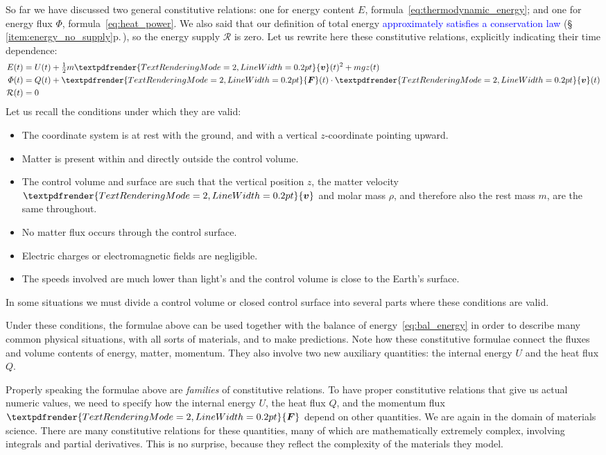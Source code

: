\documentclass[a4paper,12pt,%
onecolumn,oneside,%
british%
]{memoir}
\renewcommand*{\bm}[1]{\textpdfrender{TextRenderingMode=2,LineWidth=0.2pt}{\boldsymbol{#1}}}
\renewcommand*{\|}[1][]{\nonscript\:#1\vert\nonscript\:\mathopen{}}
\newcommand*{\sect}{\S}%
\renewcommand*{\autoref}[3][\sect\,\ref]{\textcolor{blue}{#3} {\color{blue}\scriptsize(\faIcon[regular]{eye}\;#1{#2}\;p.\,\pageref{#2})}}
\newcommand*{\yv}{\bm{v}}
\newcommand*{\yrho}{\rho}
\newcommand*{\ym}{m}%
\newcommand*{\yE}{E}
\newcommand*{\yU}{U}
\newcommand*{\yH}{\varPhi}%
\newcommand*{\yQ}{Q}%
\newcommand*{\yR}{\mathcal{R}}%
\newcommand*{\yF}{\bm{F}}
\begin{document}
So far we have discussed two general constitutive relations: one for energy content $\yE$, formula~\eqref{eq:thermodynamic_energy}; and one for energy flux $\yH$, formula~\eqref{eq:heat_power}. We also said that our definition of total energy \autoref{item:energy_no_supply}{approximately satisfies a conservation law}, so the energy supply $\yR$ is zero. Let us rewrite here these constitutive relations, explicitly indicating their time dependence:
\begin{equation*}
  \begin{aligned}
    \yE(t) &=  \yU(t) + \tfrac{1}{2}\ym \yv(t)^{2} + \ym g z(t)
    \\
    \yH(t) &= \yQ(t) + \yF(t)\cdot\yv(t)
    \\
    \yR(t) &= 0
  \end{aligned}
\end{equation*}
Let us recall the conditions under which they are valid:
\begin{itemize}[nosep]
\item The coordinate system is at rest with the ground, and with a vertical $z$-coordinate pointing upward.
\item Matter is present within and directly outside the control volume.
\item The control volume and surface are such that the vertical position $z$, the matter velocity $\yv$ and molar mass $\yrho$, and therefore also the rest mass $\ym$, are the same throughout.
\item No matter flux occurs through the control surface.
\item Electric charges or electromagnetic fields are negligible.
\item The speeds involved are much lower than light's and the control volume is close to the Earth's surface.
\end{itemize}
In some situations we must divide a control volume or closed control surface into several parts where these conditions are valid.


Under these conditions, the formulae above can be used together with the balance of energy~\eqref{eq:bal_energy} in order to describe many common physical situations, with all sorts of materials, and to make predictions. Note how these constitutive formulae connect the fluxes and volume contents of energy, matter, momentum. They also involve two new auxiliary quantities: the internal energy $\yU$ and the heat flux $\yQ$.

Properly speaking the formulae above are \emph{families} of constitutive relations. To have proper constitutive relations that give us actual numeric values, we need to specify how the internal energy $\yU$, the heat flux $\yQ$, and the momentum flux $\yF$ depend on other quantities. We are again in the domain of materials science. There are many constitutive relations for these quantities, many of which are mathematically extremely complex, involving integrals and partial derivatives. This is no surprise, because they reflect the complexity of the materials they model.
\end{document}
